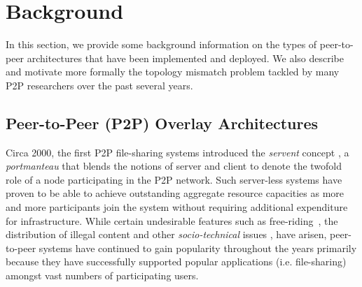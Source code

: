 \section{Background}
\label{section:background}


In this section, we provide some background information on the types of
peer-to-peer architectures that have been implemented and deployed. We also
describe and motivate more formally the topology mismatch problem tackled by
many P2P researchers over the past several years.

\subsection{Peer-to-Peer (P2P) Overlay Architectures}
Circa 2000, the first P2P file-sharing systems introduced the \emph{servent}
concept \cite{gnutella}, a \emph{portmanteau} that blends the notions of server
and client to denote the twofold role of a node participating in the P2P
network. Such server-less systems have proven to be able to achieve outstanding
aggregate resource capacities as more and more participants join the system
without requiring additional expenditure for infrastructure. While certain
undesirable features such as 
free-riding~\cite{saroiu_measurefileshare_2002,adar_gnutellafreeriders_2000,hughes_gnutellafreeride_2005},
the distribution of illegal content and other \emph{socio-technical}
issues \cite{hughes_socp2p_2008}, have arisen, peer-to-peer systems have
continued to gain popularity throughout the years primarily because they have successfully supported
popular applications (i.e. file-sharing) amongst vast numbers of participating
users.

